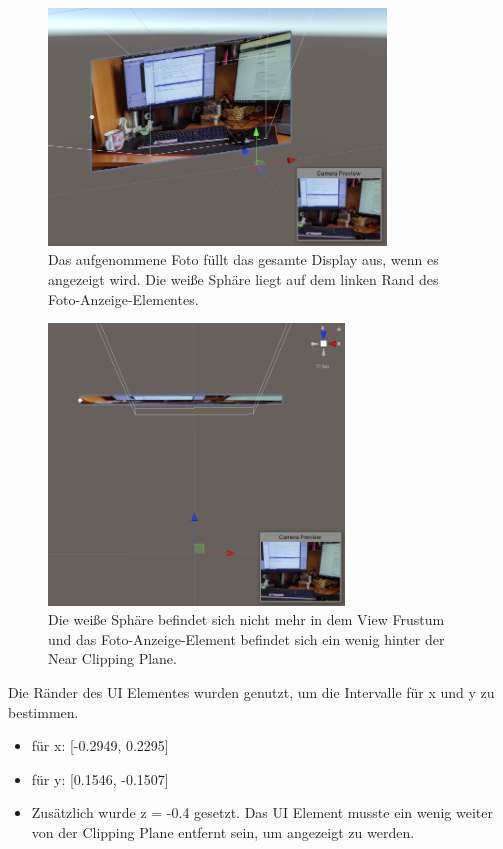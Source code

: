 \begin{figure}[H]
	\centering
	\includegraphics[width=0.8\textwidth]{images/canvasinyourface2.jpg}
	\caption[Ränder des Foto-Anzeige-Elements finden]{Das aufgenommene Foto füllt das gesamte Display aus, wenn es angezeigt wird. Die weiße Sphäre liegt auf dem linken Rand des Foto-Anzeige-Elementes.}
	\label{illustration:canvasinsourface}
\end{figure}

\begin{figure}[H]
	\centering
	\includegraphics[width=0.7\textwidth]{images/canvasinyourfaceTopDown2.jpg}
	\caption[Tiefe des Foto-Anzeige-Elements finden]{Die weiße Sphäre befindet sich nicht mehr in dem View Frustum und das Foto-Anzeige-Element befindet sich ein wenig hinter der Near Clipping Plane.}
	\label{illustration:canvasinsourfacetodown}
\end{figure}

Die Ränder des UI Elementes wurden genutzt, um die Intervalle für x und y zu bestimmen.
\begin{itemize}
	\item für x: [-0.2949, 0.2295]
	\item für y: [0.1546, -0.1507]
	\item Zusätzlich wurde z = -0.4 gesetzt. Das UI Element musste ein wenig weiter von der Clipping Plane entfernt sein, um angezeigt zu werden.
\end{itemize}

